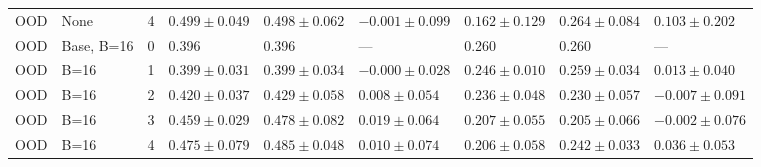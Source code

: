 \begin{table}[H]
\begin{tabular}{@{}lllllllll@{}}
OOD & None & 4 & $0.499\pm0.049$ & $0.498\pm0.062$ & $-0.001\pm0.099$ & $0.162\pm0.129$ & $0.264\pm0.084$ & $0.103\pm0.202$\\
OOD & Base, B=16 & 0 & 0.396 & 0.396 & --- & 0.260 & 0.260 & ---\\
OOD & B=16 & 1 & $0.399\pm0.031$ & $0.399\pm0.034$ & $-0.000\pm0.028$ & $0.246\pm0.010$ & $0.259\pm0.034$ & $0.013\pm0.040$\\
OOD & B=16 & 2 & $0.420\pm0.037$ & $0.429\pm0.058$ & $0.008\pm0.054$ & $0.236\pm0.048$ & $0.230\pm0.057$ & $-0.007\pm0.091$\\
OOD & B=16 & 3 & $0.459\pm0.029$ & $0.478\pm0.082$ & $0.019\pm0.064$ & $0.207\pm0.055$ & $0.205\pm0.066$ & $-0.002\pm0.076$\\
OOD & B=16 & 4 & $0.475\pm0.079$ & $0.485\pm0.048$ & $0.010\pm0.074$ & $0.206\pm0.058$ & $0.242\pm0.033$ & $0.036\pm0.053$\\
\bottomrule
\end{tabular}
\end{table}
